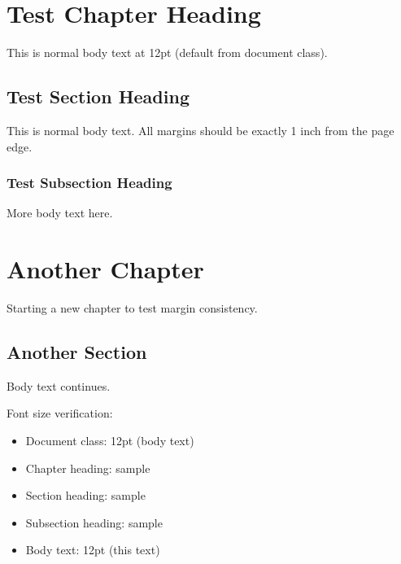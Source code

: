 \documentclass[12pt,oneside,a4paper]{report}
\begin{document}
\chapter{Test Chapter Heading}
This is normal body text at 12pt (default from document class).

\section{Test Section Heading}
This is normal body text. All margins should be exactly 1 inch from the page edge.

\subsection{Test Subsection Heading}
More body text here.

\newpage

\chapter{Another Chapter}
Starting a new chapter to test margin consistency.

\section{Another Section}
Body text continues.

\vspace{2cm}

Font size verification:
\begin{itemize}
\item Document class: 12pt (body text)
\item Chapter heading: {\fontsize{16}{19.2}\selectfont 16pt sample}
\item Section heading: {\fontsize{14}{16.8}\selectfont 14pt sample}
\item Subsection heading: {\fontsize{12}{14.4}\selectfont 12pt sample}
\item Body text: 12pt (this text)
\end{itemize}
\end{document}
